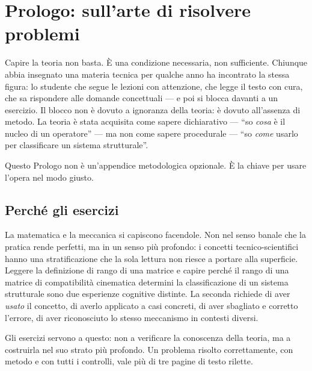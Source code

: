 \chapter*{Prologo: sull'arte di risolvere problemi}

Capire la teoria non basta. È una condizione necessaria, non sufficiente. Chiunque abbia insegnato una materia tecnica per qualche anno ha incontrato la stessa figura: lo studente che segue le lezioni con attenzione, che legge il testo con cura, che sa rispondere alle domande concettuali --- e poi si blocca davanti a un esercizio. Il blocco non è dovuto a ignoranza della teoria: è dovuto all'assenza di metodo. La teoria è stata acquisita come sapere dichiarativo --- ``so \textit{cosa} è il nucleo di un operatore'' --- ma non come sapere procedurale --- ``so \textit{come} usarlo per classificare un sistema strutturale''.

Questo Prologo non è un'appendice metodologica opzionale. È la chiave per usare l'opera nel modo giusto.


\section*{Perché gli esercizi}

La matematica e la meccanica si capiscono facendole. Non nel senso banale che la pratica rende perfetti, ma in un senso più profondo: i concetti tecnico-scientifici hanno una stratificazione che la sola lettura non riesce a portare alla superficie. Leggere la definizione di rango di una matrice e capire perché il rango di una matrice di compatibilità cinematica determini la classificazione di un sistema strutturale sono due esperienze cognitive distinte. La seconda richiede di aver \textit{usato} il concetto, di averlo applicato a casi concreti, di aver sbagliato e corretto l'errore, di aver riconosciuto lo stesso meccanismo in contesti diversi.

Gli esercizi servono a questo: non a verificare la conoscenza della teoria, ma a costruirla nel suo strato più profondo. Un problema risolto correttamente, con metodo e con tutti i controlli, vale più di tre pagine di testo rilette.

